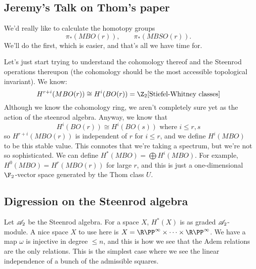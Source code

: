 \documentclass[11pt]{article}
\newcommand{\KanSemResponse}[1]
{
\thispagestyle{fancy}
\section{#1}
}
\begin{document}
\begin{JeremyThomTalk}
\KanSemResponse
{Jeremy's Talk on Thom's paper}
\renewcommand{\Steen}{\scrA_2}
We'd really like to calculate the homotopy groups
\[\pi_*({MBO}(r)),\qquad \pi_*({MBSO}(r)).\]
We'll do the first, which is easier, and that's all we have time for.

Let's just start trying to understand the cohomology thereof and the Steenrod operations thereupon (the cohomology should be the most accessible topological invariant). We know: 
\[H^{r+i}(MBO(r))\cong H^i(BO(r))=\Z_2[\text{Stiefel-Whitney classes}]\]
Although we know the cohomology ring, we aren't completely sure yet as the action of the steenrod algebra. Anyway, we know that
\[H^i(BO(r))\cong H^i(BO(s))\text{ where $i\leq r,s$}\]
so $H^{r+i}(MBO(r))$ is independent of $r$ for $i\leq r$, and we define $H^i(MBO)$ to be this stable value. This connotes that we're taking a spectrum, but we're not so sophisticated. We can define $H^*(MBO)=\bigoplus H^i(MBO)$. For example, $H^0(MBO)=H^r(MBO(r))$ for large $r$, and this is just a one-dimensional $\F_2$-vector space generated by the Thom class $U$.

\subsection*{Digression on the Steenrod algebra}
Let $\Steen$ be the Steenrod algebra. For a space $X$, $H^*(X)$ is as graded $\Steen$-module. A nice space $X$ to use here is $X=\RP^\infty\times\cdots\times\RP^\infty$. We have a map
\funcdef{\omega:\Steen}{H^*(X)}{a}{a(u_1\otimes\cdots\otimes u_n)}
$\omega$ is injective in degree $\leq n$, and this is how we see that the Adem relations are the only relations. This is the simplest case where we see the linear independence of a bunch of the admissible squares.


\end{JeremyThomTalk}
\end{document}
